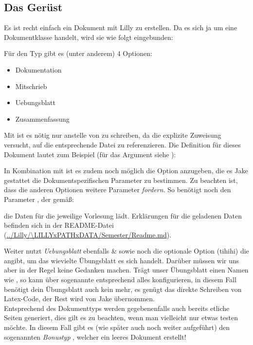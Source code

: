 \subsection{Das Gerüst}
Es ist recht einfach ein Dokument mit Lilly zu erstellen. Da es sich ja um eine Dokumentklasse handelt, wird sie wie folgt eingebunden:
Für den Typ gibt es (unter anderem) $4$ Optionen:
\begin{multicols}{2}
    \begin{itemize}[label=$\diamond$]\narrowitems
        \item Dokumentation
        \item Mitschrieb
        \item Uebungsblatt
        \item Zusammenfassung
    \end{itemize}
\end{multicols}
Mit  ist es nötig nur  anstelle von  zu schreiben, da die explizite Zuweisung versucht, auf die entsprechende Datei zu referenzieren. Die Definition für dieses Dokument lautet zum Beispiel (für das Argument  siehe ): %
In Kombination mit \Jake ist es zudem noch möglich die Option  anzugeben, die es Jake gestattet die Dokumentspezifischen Parameter zu bestimmen.\newline
Zu beachten ist, dass die anderen Optionen weitere Parameter \emph{fordern}. \newline
So benötigt  noch den Parameter , der gemäß:
\begin{latex*}

\end{latex*}
die Daten für die jeweilige Vorlesung lädt.
Erklärungen für die geladenen Daten befinden sich in der README-Datei (\url{../Lilly/\LILLYxPATHxDATA/Semester/Readme.md}).

%
%
%

Weiter nutzt \emph{Uebungsblatt} ebenfalls \& sowie noch die optionale Option (tihihi)  die angibt, um das wievielte Übungsblatt es sich handelt. Darüber müssen wir uns aber in der Regel keine Gedanken machen. Trägt unser Übungsblatt einen Namen wie , so kann \Jake über sogenannte  entsprechend alles konfigurieren, in diesem Fall benötigt dein Übungsblatt auch kein  mehr, es genügt das direkte Schreiben von Latex-Code, der Rest wird von Jake übernommen.\\
Entsprechend des Dokumenttyps werden gegebenenfalls auch bereits etliche Seiten generiert, dies gilt es zu beachten, wenn man vielleicht nur etwas testen möchte. In diesem Fall gibt es (wie später auch noch weiter aufgeführt) den sogenannten \emph{Bonustyp} , welcher ein leeres Dokument erstellt! %
\clearpage
